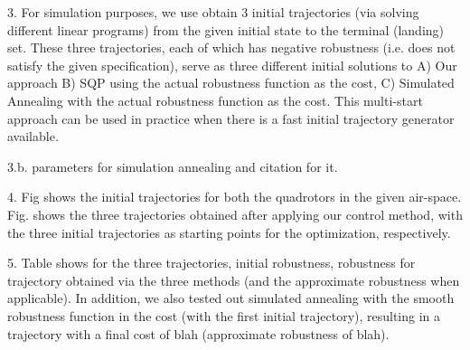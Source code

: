 3. For simulation purposes, we use obtain 3 initial trajectories (via solving different linear programs) from the given initial state to the terminal (landing) set. These three trajectories, each of which has negative robustness (i.e. does not satisfy the given specification), serve as three different initial solutions to A) Our approach B) SQP using the actual robustness function as the cost, C) Simulated Annealing with the actual robustness function as the cost. This multi-start approach can be used in practice when there is a fast initial trajectory generator available.

3.b. parameters for simulation annealing and citation for it.

4. Fig shows the initial trajectories for both the quadrotors in the given air-space. Fig. shows the three trajectories obtained after applying our control method, with the three initial trajectories as starting points for the optimization, respectively. 

5. Table shows for the three trajectories, initial robustness, robustness for trajectory obtained via the three methods (and the approximate robustness when applicable). In addition, we also tested out simulated annealing with the smooth robustness function in the cost (with the first initial trajectory), resulting in a trajectory with a final cost of blah (approximate robustness of blah).





